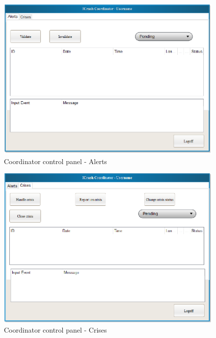 \begin{figure}
  \centering
    \includegraphics[scale=0.75]{images/mockups/other/CoordinatorControlPanelAlerts.eps}
  \caption{Coordinator control panel - Alerts}
  \label{fig:CoordinatorControlPanelAlerts}
\end{figure}


\begin{figure}
  \centering
    \includegraphics[scale=0.75]{images/mockups/other/CoordinatorControlPanelCrises.eps}
  \caption{Coordinator control panel - Crises}
  \label{fig:CoordinatorControlPanelCrises}
\end{figure}


